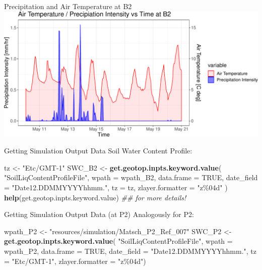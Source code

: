 \documentclass[
  ignorenonframetext,
]{beamer}
\newenvironment{Shaded}{\begin{snugshade}}{\end{snugshade}}
\newcommand{\CommentTok}[1]{\textcolor[rgb]{0.56,0.35,0.01}{\textit{#1}}}
\newcommand{\DataTypeTok}[1]{\textcolor[rgb]{0.13,0.29,0.53}{#1}}
\newcommand{\KeywordTok}[1]{\textcolor[rgb]{0.13,0.29,0.53}{\textbf{#1}}}
\newcommand{\NormalTok}[1]{#1}
\newcommand{\OtherTok}[1]{\textcolor[rgb]{0.56,0.35,0.01}{#1}}
\newcommand{\StringTok}[1]{\textcolor[rgb]{0.31,0.60,0.02}{#1}}
\begin{document}
\begin{frame}{Precipitation and Air Temperature at B2}
\protect\hypertarget{precipitation-and-air-temperature-at-b2}{}
\includegraphics{cordanoe_geotopbricks_presenetation_files/figure-beamer/unnamed-chunk-3-1.pdf}
\end{frame}

\begin{frame}[fragile]{Getting Simulation Output Data}
\protect\hypertarget{getting-simulation-output-data}{}
Soil Water Content Profile:

\begin{Shaded}
\begin{Highlighting}[]
\NormalTok{tz <{-}}\StringTok{ "Etc/GMT{-}1"}
\NormalTok{SWC\_B2  <{-}}\StringTok{ }\KeywordTok{get.geotop.inpts.keyword.value}\NormalTok{(}
  \StringTok{"SoilLiqContentProfileFile"}\NormalTok{,}
  \DataTypeTok{wpath =}\NormalTok{ wpath\_B2,}
  \DataTypeTok{data.frame =} \OtherTok{TRUE}\NormalTok{,}
  \DataTypeTok{date\_field =} \StringTok{"Date12.DDMMYYYYhhmm."}\NormalTok{,}
  \DataTypeTok{tz =}\NormalTok{ tz,}
  \DataTypeTok{zlayer.formatter =} \StringTok{"z\%04d"}
\NormalTok{)}
\KeywordTok{help}\NormalTok{(get.geotop.inpts.keyword.value) }\CommentTok{\#\# for more details!}
\end{Highlighting}
\end{Shaded}
\end{frame}

\begin{frame}[fragile]{Getting Simulation Output Data (at P2)}
\protect\hypertarget{getting-simulation-output-data-at-p2}{}
Analogously for P2:

\begin{Shaded}
\begin{Highlighting}[]
\NormalTok{wpath\_P2 <{-}}\StringTok{ "resources/simulation/Matsch\_P2\_Ref\_007"} 
\NormalTok{SWC\_P2  <{-}}\StringTok{ }\KeywordTok{get.geotop.inpts.keyword.value}\NormalTok{(}
  \StringTok{"SoilLiqContentProfileFile"}\NormalTok{,}
  \DataTypeTok{wpath =}\NormalTok{ wpath\_P2,}
  \DataTypeTok{data.frame =} \OtherTok{TRUE}\NormalTok{,}
  \DataTypeTok{date\_field =} \StringTok{"Date12.DDMMYYYYhhmm."}\NormalTok{,}
  \DataTypeTok{tz =} \StringTok{"Etc/GMT{-}1"}\NormalTok{,}
  \DataTypeTok{zlayer.formatter =} \StringTok{"z\%04d"}\NormalTok{)}
\end{Highlighting}
\end{Shaded}
\end{frame}
\end{document}
